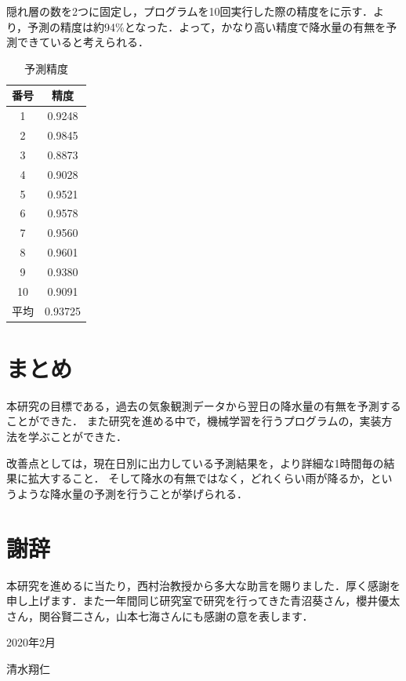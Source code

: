 \documentclass{eithesis}
\begin{document}
	隠れ層の数を2つに固定し，プログラムを10回実行した際の精度をに示す．より，予測の精度は約94\%となった．よって，かなり高い精度で降水量の有無を予測できていると考えられる．
	\begin{table}[htbp]
		\centering 
		\caption{予測精度}
		\label{tab_acc}
		\begin{tabular}[htbp]{c|c}
			番号 & 精度 \\ \hline
			1 & 0.9248 \\
			2 & 0.9845 \\
			3 & 0.8873 \\
			4 & 0.9028 \\
			5 & 0.9521 \\
			6 & 0.9578 \\
			7 & 0.9560 \\
			8 & 0.9601 \\
			9 & 0.9380 \\
			10 & 0.9091 \\ \hline
			平均 & 0.93725
		\end{tabular}
	\end{table}

\chapter{まとめ}
	本研究の目標である，過去の気象観測データから翌日の降水量の有無を予測することができた．
	また研究を進める中で，機械学習を行うプログラムの，実装方法を学ぶことができた．

	改善点としては，現在日別に出力している予測結果を，より詳細な1時間毎の結果に拡大すること．
	そして降水の有無ではなく，どれくらい雨が降るか，というような降水量の予測を行うことが挙げられる．

\chapter*{謝辞}
	本研究を進めるに当たり，西村治教授から多大な助言を賜りました．厚く感謝を申し上げます．また一年間同じ研究室で研究を行ってきた青沼葵さん，櫻井優太さん，関谷賢二さん，山本七海さんにも感謝の意を表します．
	\begin{flushright}
		2020年2月

		清水翔仁
	\end{flushright}
\end{document}
